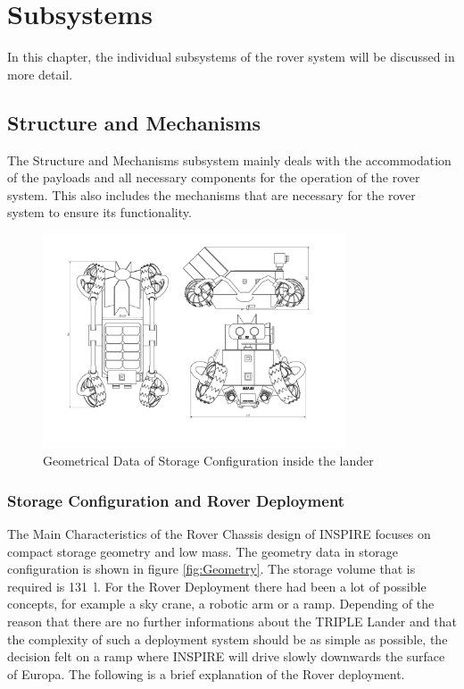 \chapter{Subsystems}
\label{chap:subsystems}

In this chapter, the individual subsystems of the rover system will be discussed in more detail.

\section{Structure and Mechanisms}
\label{sec:mechanics}

The Structure and Mechanisms subsystem mainly deals with the accommodation of the payloads and all necessary components for the operation of the rover system. This also includes the mechanisms that are necessary for the rover system to ensure its functionality. 


\begin{figure}[htb]
     \centering
     \includegraphics[width=0.8\textwidth]{Media/INSPIRE_blackwhite.pdf}
     \caption{Geometrical Data of Storage Configuration inside the lander}
     \label{fig:Geometry}
\end{figure}



\subsection{Storage Configuration and Rover Deployment}

The Main Characteristics of the Rover Chassis design of INSPIRE focuses on compact storage geometry and low mass.  
The geometry data in storage configuration is shown in figure \autoref{fig:Geometry}.
The storage volume that is required is 131~l.
For the Rover Deployment there had been a lot of possible concepts, for example a sky crane, a robotic arm or a ramp. Depending of the reason that there are no further informations about the TRIPLE Lander and that the complexity of such a deployment system should be as simple as possible, the decision felt on a ramp where INSPIRE will drive slowly downwards the surface of Europa.
The following is a brief explanation of the Rover deployment.
 

